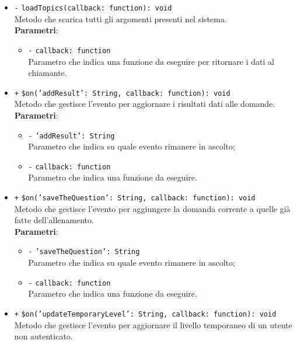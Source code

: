 \begin{itemize}
\begin{itemize}
\begin{itemize}
		\end{itemize}
		\item \texttt{-} \texttt{loadTopics(callback: function): void} \\
		Metodo che scarica tutti gli argomenti presenti nel sistema. \\
		\textbf{Parametri}:
		\begin{itemize}
			\item \texttt{-} \texttt{callback: function} \\
			Parametro che indica una funzione da eseguire per ritornare i dati al chiamante.
		\end{itemize}
		
		\item \texttt{+} \texttt{\$on('addResult': String, callback: function): void} \\
		Metodo che gestisce l'evento per aggiornare i risultati dati alle domande. \\
		\textbf{Parametri}:
		\begin{itemize}
			\item \texttt{-} \texttt{'addResult': String} \\
			Parametro che indica su quale evento rimanere in ascolto;
			\item \texttt{-} \texttt{callback: function} \\
			Parametro che indica una funzione da eseguire.
		\end{itemize}
		\item \texttt{+} \texttt{\$on('saveTheQuestion': String, callback: function): void} \\
		Metodo che gestisce l'evento per aggiungere la domanda corrente a quelle già fatte dell'allenamento. \\
		\textbf{Parametri}:
		\begin{itemize}
			\item \texttt{-} \texttt{'saveTheQuestion': String} \\
			Parametro che indica su quale evento rimanere in ascolto;
			\item \texttt{-} \texttt{callback: function} \\
			Parametro che indica una funzione da eseguire.
		\end{itemize}
		\item \texttt{+} \texttt{\$on('updateTemporaryLevel': String, callback: function): void} \\
		Metodo che gestisce l'evento per aggiornare il livello temporaneo di un utente non autenticato. \\

\end{itemize}
\end{itemize}
